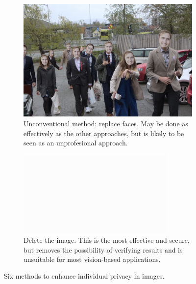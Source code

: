 \begin{figure}[H]
    \begin{subfigure}{0.46\textwidth}
        \centering
        \includegraphics[width=\textwidth]{Images/Obfuscation/me_my_friends_and_I.png}
        \caption{Unconventional method: replace faces. May be done as effectively as the other approaches, but is likely to be seen as an unprofesional approach.}
    \end{subfigure}
    \hfill
    \begin{subfigure}{0.46\textwidth}
        \centering
        \includegraphics[width=\textwidth]{Images/Obfuscation/white.png}
        \caption{Delete the image. This is the most effective and secure, but removes the possibility of verifying results and is unsuitable for most vision-based applications.}
    \end{subfigure}

    \caption{Six methods to enhance individual privacy in images.}
    \label{fig:obfuscation_methods}
\end{figure}

